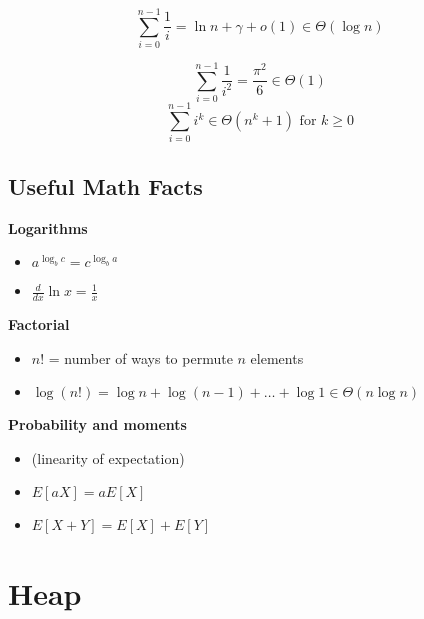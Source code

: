 \documentclass[letterpaper, 12pt]{article}
\newcommand{\red}[1]{{\color{red}{#1}}}
\begin{document}
    \red{Harmonic sequence}
    $$\sum_{i=0}^{n-1}\frac{1}{i} = \ln n + \gamma + o(1) \in \Theta(\log n)$$

    \red{A few more}
    $$\sum_{i=0}^{n-1}\frac{1}{i^2} = \frac{\pi^2}{6} \in \Theta(1)$$
    $$\sum_{i=0}^{n-1}i^k \in \Theta(n^k+1) \text{ for } k \geq 0$$
    \pagebreak

    \subsection{Useful Math Facts}
    \textbf{Logarithms}\\
    \begin{itemize}
        \item $a^{\log_{b}c} = c^{\log_{b}a}$
        \item $\frac{d}{dx}\ln x = \frac{1}{x}$
    \end{itemize}

    \textbf{Factorial}\\
    \begin{itemize}
        \item $n!$ = number of ways to permute $n$ elements
        \item $\log(n!) = \log n + \log (n-1) + \dots + \log 1 \in \Theta(n\log n)$
    \end{itemize}

    \textbf{Probability and moments}\\
    \begin{itemize}
        \item (linearity of expectation)
        \item $E[aX] = aE[X]$
        \item $E[X+Y] = E[X] + E[Y]$ 
    \end{itemize}
    \pagebreak

    \section{Heap}
    
\end{document}
